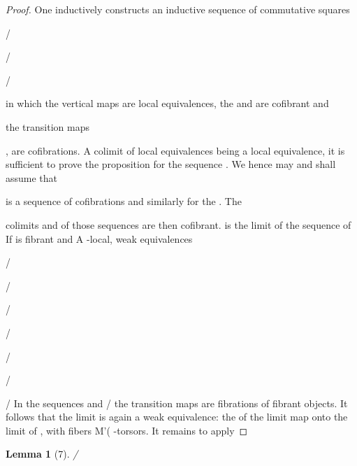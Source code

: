 \documentclass[11pt,a4paper]{article}
\theoremstyle{plain}
\newtheorem{lemma}[theorem]{Lemma}
\theoremstyle{definition}
\begin{document}
\begin{proof} One inductively constructs an inductive sequence of commutative squares



/ 













/ 




/

in which the vertical maps are local equivalences, the  and  are cofibrant and



the transition maps 

 ,
  are cofibrations. A colimit of local
equivalences being a local equivalence, it is sufficient to prove the proposition for
the sequence  . We hence may and shall assume that 


is a sequence of cofibrations and similarly for the 
. The


colimits and of those sequences are then cofibrant.
is the limit of the sequence of
If is fibrant and A -local,
weak equivalences

/

/

 



/

/

  

/

/ 

   / 
In the sequences     and /   the transition maps are fibrations of
fibrant objects. It follows that the limit is again a weak equivalence: the  of the
limit map onto the limit of  , with fibers M'(   -torsors. It remains to apply


\end{proof}

\begin{lemma}[7]

/

\end{lemma}
\end{document}

